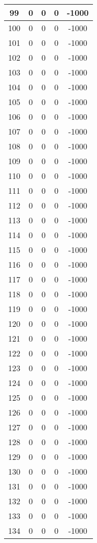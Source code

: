 \documentclass[letterpaper, 12pt]{article}
\begin{document}
\begin{longtable}{|c|c|c|c|c|}
\hline
99 & 0 & 0 & 0 & -1000 \\
\hline
100 & 0 & 0 & 0 & -1000 \\
\hline
101 & 0 & 0 & 0 & -1000 \\
\hline
102 & 0 & 0 & 0 & -1000 \\
\hline
103 & 0 & 0 & 0 & -1000 \\
\hline
104 & 0 & 0 & 0 & -1000 \\
\hline
105 & 0 & 0 & 0 & -1000 \\
\hline
106 & 0 & 0 & 0 & -1000 \\
\hline
107 & 0 & 0 & 0 & -1000 \\
\hline
108 & 0 & 0 & 0 & -1000 \\
\hline
109 & 0 & 0 & 0 & -1000 \\
\hline
110 & 0 & 0 & 0 & -1000 \\
\hline
111 & 0 & 0 & 0 & -1000 \\
\hline
112 & 0 & 0 & 0 & -1000 \\
\hline
113 & 0 & 0 & 0 & -1000 \\
\hline
114 & 0 & 0 & 0 & -1000 \\
\hline
115 & 0 & 0 & 0 & -1000 \\
\hline
116 & 0 & 0 & 0 & -1000 \\
\hline
117 & 0 & 0 & 0 & -1000 \\
\hline
118 & 0 & 0 & 0 & -1000 \\
\hline
119 & 0 & 0 & 0 & -1000 \\
\hline
120 & 0 & 0 & 0 & -1000 \\
\hline
121 & 0 & 0 & 0 & -1000 \\
\hline
122 & 0 & 0 & 0 & -1000 \\
\hline
123 & 0 & 0 & 0 & -1000 \\
\hline
124 & 0 & 0 & 0 & -1000 \\
\hline
125 & 0 & 0 & 0 & -1000 \\
\hline
126 & 0 & 0 & 0 & -1000 \\
\hline
127 & 0 & 0 & 0 & -1000 \\
\hline
128 & 0 & 0 & 0 & -1000 \\
\hline
129 & 0 & 0 & 0 & -1000 \\
\hline
130 & 0 & 0 & 0 & -1000 \\
\hline
131 & 0 & 0 & 0 & -1000 \\
\hline
132 & 0 & 0 & 0 & -1000 \\
\hline
133 & 0 & 0 & 0 & -1000 \\
\hline
134 & 0 & 0 & 0 & -1000 \\

\end{longtable}
\end{document}
